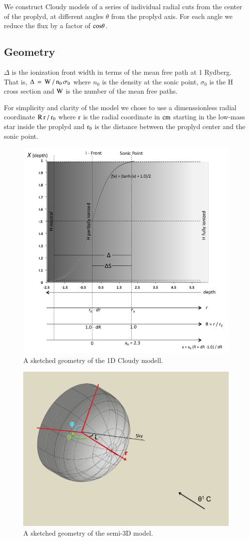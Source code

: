 \documentclass[aaspp]{article}
\begin{document}
We construct Cloudy models of a series of individual radial cuts from the center of the proplyd, at different angles $\theta$ from the proplyd axis. For each angle we reduce the flux by a factor of $\rm cos \theta$.

\subsection{Geometry}
\label{sec:geometry}

$\Delta$ is the ionization front width in terms of the mean free path at 1 Rydberg. That is, $\rm \Delta \, = \, W \, / \, n_0 \, \sigma_0$ where $n_0$ is the density at the sonic point, $\sigma_0$ is the H cross section and $\rm W$ is the number of the mean free paths.

For simplicity and clarity of the model we chose to use a dimenssionless radial coordinate $\rm R \, r\,/\,r_0$ where $\rm r$ is the radial coordinate in $\rm cm$ starting in the low-mass star inside the proplyd and $\rm r_0$ is the distance between the proplyd center and the sonic point.

\begin{figure}[h]
\centering
  \includegraphics[width=8.5 cm]{./IFront/ifront.png}
  \caption{A sketched geometry of the 1D Cloudy modell.} \label{fig:1Dgeom}
\end{figure}

\begin{figure}[h]
  \centering
  \includegraphics[width=8.5 cm]{./graf_model_3D/geometry_model.jpg}
  \caption{A sketched geometry of the semi-3D model.} \label{fig:3Dgeom}
\end{figure}
\end{document}
